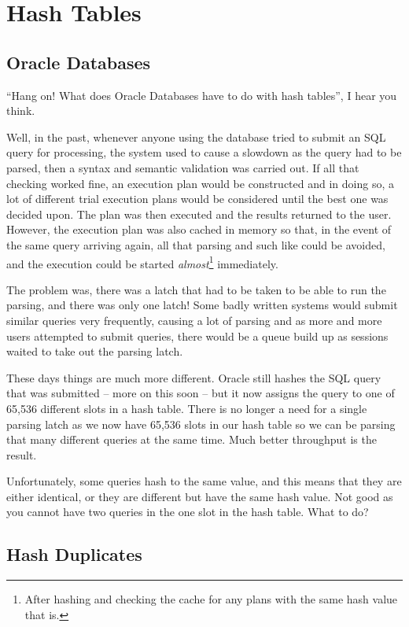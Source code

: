 
\chapter{Hash Tables}

\section{Oracle Databases}

``Hang on! What does Oracle Databases have to do with hash tables'',
I hear you think.

Well, in the past, whenever anyone using the database tried to submit
an SQL query for processing, the system used to cause a slowdown as
the query had to be parsed, then a syntax and semantic validation
was carried out. If all that checking worked fine, an execution plan
would be constructed and in doing so, a lot of different trial execution
plans would be considered until the best one was decided upon. The
plan was then executed and the results returned to the user. However,
the execution plan was also cached in memory so that, in the event
of the same query arriving again, all that parsing and such like could
be avoided, and the execution could be started \emph{almost}\footnote{After hashing and checking the cache for any plans with the same hash
value that is.} immediately.

The problem was, there was a latch that had to be taken to be able
to run the parsing, and there was only one latch! Some badly written
systems would submit similar queries very frequently, causing a lot
of parsing and as more and more users attempted to submit queries,
there would be a queue build up as sessions waited to take out the
parsing latch.

These days things are much more different. Oracle still hashes the
SQL query that was submitted -- more on this soon -- but it now
assigns the query to one of 65,536 different slots in a hash table.
There is no longer a need for a single parsing latch as we now have
65,536 slots in our hash table so we can be parsing that many different
queries at the same time. Much better throughput is the result.

Unfortunately, some queries hash to the same value, and this means
that they are either identical, or they are different but have the
same hash value. Not good as you cannot have two queries in the one
slot in the hash table. What to do?

\section{Hash Duplicates}

